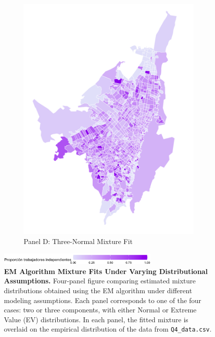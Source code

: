 \documentclass{article}
\begin{document}
\begin{figure}[p]
\begin{subfigure}[b]{0.4\textwidth}
        \includegraphics[width=\linewidth]{figs_dep_maps/mapa_dep_2023.png}
        \caption{Panel D: Three-Normal Mixture Fit}
        \label{fig:panelD}
    \end{subfigure}
    
    \vspace{0.3cm} %
    \begin{minipage}{\textwidth} %
        \begin{flushright} %
            \includegraphics[width=0.7\textwidth]{figs_dep_maps/clasificacion.png} %
        \end{flushright}
    \end{minipage}
    
    \caption{
        \textbf{EM Algorithm Mixture Fits Under Varying Distributional Assumptions.}
        Four-panel figure comparing estimated mixture distributions obtained using the EM algorithm under different modeling assumptions. Each panel corresponds to one of the four cases: two or three components, with either Normal or Extreme Value (EV) distributions. In each panel, the fitted mixture is overlaid on the empirical distribution of the data from \texttt{Q4\_data.csv}.
    }
    \label{fig:fourpanel}
\end{figure}
\end{document}
